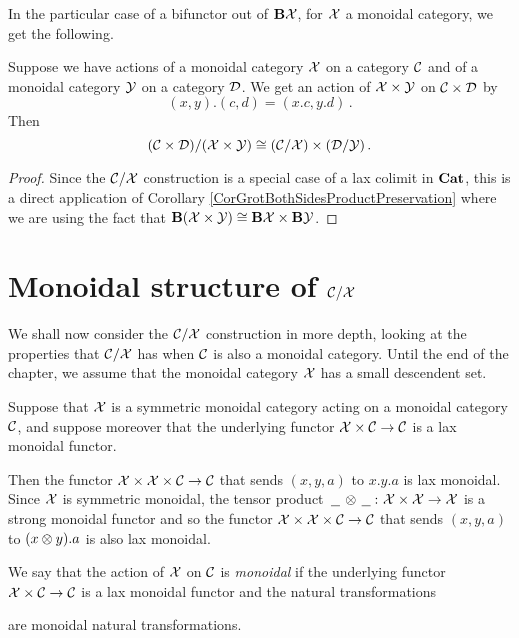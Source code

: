 In the particular case of a bifunctor out of $\mathbf B\mathcal X$, for $\mathcal X$ a monoidal category, we get the following.

\begin{corollary}
  Suppose we have actions of a monoidal category $\mathcal X$ on a category ${\mathcal{C}}$ and of a monoidal category $\mathcal Y$ on a category ${\mathcal{D}}$.
  We get an action of $\mathcal X\times\mathcal Y$ on ${\mathcal{C}}\times {\mathcal{D}}$ by
  \[
    (x,y).(c,d) = (x.c,y.d)\,.
    \]
  Then
  \[
    ({\mathcal{C}}\times{\mathcal{D}})/(\mathcal X\times\mathcal Y)\cong ({\mathcal{C}}/\mathcal X) \times ({\mathcal{D}}/\mathcal Y)\,.
    \]
  \label{CorQuotProductPreservation}
\end{corollary}
\begin{proof}
  Since the ${\mathcal{C}}/\mathcal X$ construction is a special case of a lax colimit in ${\normalfont\textbf{Cat}}$, this is a direct application of Corollary \ref{CorGrotBothSidesProductPreservation} where we are using the fact that $\mathbf B(\mathcal X\times\mathcal Y)\cong \mathbf B\mathcal X \times \mathbf B\mathcal Y$.
\end{proof}

\section{Monoidal structure of ${\mathcal{C}}/\mathcal X$}

We shall now consider the ${\mathcal{C}}/\mathcal X$ construction in more depth, looking at the properties that ${\mathcal{C}}/\mathcal X$ has when ${\mathcal{C}}$ is also a monoidal category.  
Until the end of the chapter, we assume that the monoidal category $\mathcal X$ has a small descendent set.

\begin{definition}
  Suppose that $\mathcal X$ is a symmetric monoidal category acting on a monoidal category ${\mathcal{C}}$, and suppose moreover that the underlying functor $\mathcal X\times{\mathcal{C}} \to {\mathcal{C}}$ is a lax monoidal functor.  
  
  Then the functor $\mathcal X\times\mathcal X\times{\mathcal{C}}\to {\mathcal{C}}$ that sends $(x,y,a)$ to $x.y.a$ is lax monoidal.  
  Since $\mathcal X$ is symmetric monoidal, the tensor product $\,\underline{\hspace{1.5ex}}\,\otimes\,\underline{\hspace{1.5ex}}\,\colon \mathcal X \times\mathcal X \to \mathcal X$ is a strong monoidal functor and so the functor $\mathcal X \times \mathcal X \times {\mathcal{C}} \to {\mathcal{C}}$ that sends $(x,y,a)$ to $(x\otimes y).a$ is also lax monoidal.

  We say that the action of $\mathcal X$ on ${\mathcal{C}}$ is \emph{monoidal} if the underlying functor $\mathcal X \times {\mathcal{C}} \to {\mathcal{C}}$ is a lax monoidal functor and the natural transformations
  are monoidal natural transformations.
  \label{DefMonoidalLaxAction}
\end{definition}

